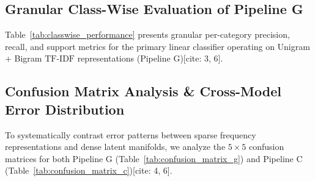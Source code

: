 \documentclass[11pt,a4paper]{article}
\begin{document}
	\subsection{Granular Class-Wise Evaluation of Pipeline G}
	Table~\ref{tab:classwise_performance} presents granular per-category precision, recall, and support metrics for the primary linear classifier operating on Unigram + Bigram $\text{TF-IDF}$ representations (Pipeline G)[cite: 3, 6].
	
	\begin{table}[H]
		\centering
		\caption{Detailed class-wise performance breakdown for Pipeline G ($\text{TF-IDF}$ Unigram + Bigram $\to$ Logistic Regression).}
		\label{tab:classwise_performance}
	\end{table}
	
	\subsection{Confusion Matrix Analysis \& Cross-Model Error Distribution}
	To systematically contrast error patterns between sparse frequency representations and dense latent manifolds, we analyze the $5 \times 5$ confusion matrices for both Pipeline G (Table~\ref{tab:confusion_matrix_g}) and Pipeline C (Table~\ref{tab:confusion_matrix_c})[cite: 4, 6].
	
\end{document}
